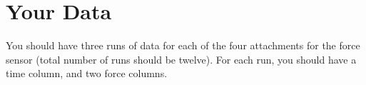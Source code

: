 \section{Your Data}
%
You should have three runs of data for each of the four attachments for the force sensor (total number of runs should be twelve). For each run, you should have a time column, and two force columns. 
%
%
\newpage
